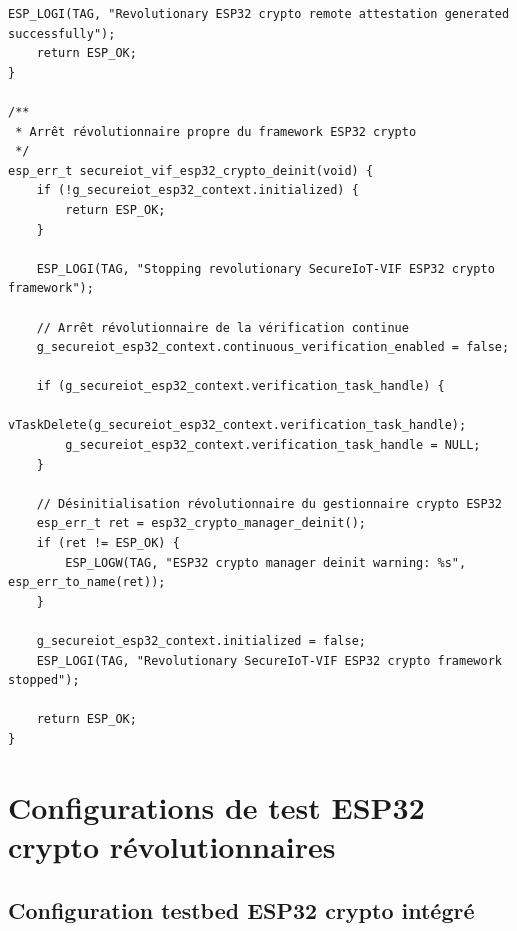 \begin{lstlisting}[caption={Implémentation révolutionnaire complète du module de vérification d'intégrité ESP32 crypto intégré}]
    ESP_LOGI(TAG, "Revolutionary ESP32 crypto remote attestation generated successfully");
    return ESP_OK;
}

/**
 * Arrêt révolutionnaire propre du framework ESP32 crypto
 */
esp_err_t secureiot_vif_esp32_crypto_deinit(void) {
    if (!g_secureiot_esp32_context.initialized) {
        return ESP_OK;
    }
    
    ESP_LOGI(TAG, "Stopping revolutionary SecureIoT-VIF ESP32 crypto framework");
    
    // Arrêt révolutionnaire de la vérification continue
    g_secureiot_esp32_context.continuous_verification_enabled = false;
    
    if (g_secureiot_esp32_context.verification_task_handle) {
        vTaskDelete(g_secureiot_esp32_context.verification_task_handle);
        g_secureiot_esp32_context.verification_task_handle = NULL;
    }
    
    // Désinitialisation révolutionnaire du gestionnaire crypto ESP32
    esp_err_t ret = esp32_crypto_manager_deinit();
    if (ret != ESP_OK) {
        ESP_LOGW(TAG, "ESP32 crypto manager deinit warning: %s", esp_err_to_name(ret));
    }
    
    g_secureiot_esp32_context.initialized = false;
    ESP_LOGI(TAG, "Revolutionary SecureIoT-VIF ESP32 crypto framework stopped");
    
    return ESP_OK;
}
\end{lstlisting}

\section{Configurations de test ESP32 crypto révolutionnaires}

\subsection{Configuration testbed ESP32 crypto intégré}

